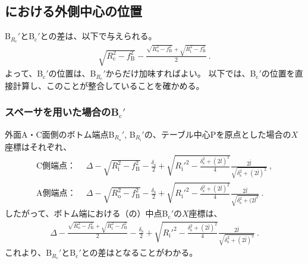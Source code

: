 \subsection{\BottomEndFace における外側中心の位置}
\BottomCurvatureCenter B$_{R_\mathrm c}'$と\BottomODCenter B$_\mathrm c'$との差は、以下で与えられる。
\begin{align}
  \label{eq:BRc-Bc}
  \sqrt{R_\mathrm c^2-f_\mathrm B^2}
  -\frac{\sqrt{R_\mathrm o^2-f_\mathrm B^2}+\sqrt{R_\mathrm i^2-f_\mathrm B^2}}2\ .
\end{align}
よって、\BottomODCenter B$_\mathrm c'$の位置は、\BottomCurvatureCenter B$_{R_\mathrm c}'$からだけ加味すればよい。
以下では、\BottomODCenter B$_\mathrm c'$の位置を直接計算し、このことが整合していることを確かめる。

\subsubsection{スペーサを用いた場合のB\texorpdfstring{$_\mathrm c'$}{c'}}
外面A・C面側のボトム端点B$_{R_\mathrm o}'$, B$_{R_\mathrm i}'$の、テーブル中心Pを原点とした場合の$X$座標はそれぞれ、
\begin{align*}
  \text{C側端点：}&~~
  \Delta-\sqrt{R_\mathrm i^2-f_\mathrm B^2}-\frac{\delta_\mathrm s}2+\sqrt{R_\mathrm i'^2-\frac{\delta_\mathrm s^2+(2\bar l)^2}4}\frac{2\bar l}{\sqrt{\delta_\mathrm s^2+(2\bar l)^2}}\ ,\\
  \text{A側端点：}&~~
  \Delta-\sqrt{R_\mathrm o^2-f_\mathrm B^2}-\frac{\delta_\mathrm s}2+\sqrt{R_\mathrm i'^2-\frac{\delta_\mathrm s^2+(2\bar l)^2}4}\frac{2\bar l}{\sqrt{\delta_\mathrm s^2+(2\bar l^2}}\ .
\end{align*}
したがって、ボトム端における（\ACOD の）中点B$_\mathrm c'$の$X$座標は、
\begin{align}
  \label{eq:spacerBc}
  \Delta-\frac{\sqrt{R_\mathrm o^2-f_\mathrm B^2}+\sqrt{R_\mathrm i^2-f_\mathrm B^2}}2
  -\frac{\delta_\mathrm s}2+\sqrt{R_\mathrm i'^2-\frac{\delta_\mathrm s^2+(2\bar l)^2}4}\frac{2\bar l}{\sqrt{\delta_\mathrm s^2+(2\bar l)^2}}\ .
\end{align}
これより、\BottomCurvatureCenter B$_{R_\mathrm c}'$と\BottomODCenter B$_\mathrm c'$との差はとなることがわかる。

